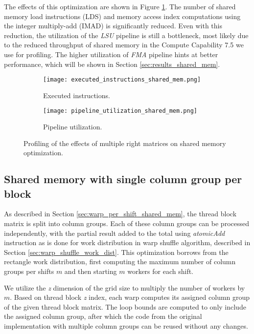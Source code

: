 
The effects of this optimization are shown in Figure \ref{fig:shared_memory_multimat_right_profiling}. The number of shared memory load instructions (LDS) and memory access index computations using the integer multiply-add (IMAD) is significantly reduced. Even with this reduction, the utilization of the \textit{LSU} pipeline is still a bottleneck, most likely due to the reduced throughput of shared memory in the Compute Capability 7.5 we use for profiling. The higher utilization of \textit{FMA} pipeline hints at better performance, which will be shown in Section \ref{sec:results_shared_mem}.


\begin{figure}[ht]
	\centering	
	\begin{subfigure}{0.8\textwidth}
		\centering
		\texttt{[image: executed\_instructions\_shared\_mem.png]}
		\caption{Executed instructions.}
	\end{subfigure}
	\hfill
	\begin{subfigure}{0.8\textwidth}
		\centering
		\texttt{[image: pipeline\_utilization\_shared\_mem.png]}
		\caption{Pipeline utilization.}
	\end{subfigure}
	
	\caption{Profiling of the effects of multiple right matrices on shared memory optimization.}
	\label{fig:shared_memory_multimat_right_profiling}
\end{figure}

\subsection{Shared memory with single column group per block}
\label{sec:column_group_per_worker}
As described in Section \ref{sec:warp_per_shift_shared_mem}, the thread block matrix is split into column groups. Each of these column groups can be processed independently, with the partial result added to the total using \textit{atomicAdd} instruction as is done for work distribution in warp shuffle algorithm, described in Section \ref{sec:warp_shuffle_work_dist}. This optimization borrows from the rectangle work distribution, first computing the maximum number of column groups per shifts $m$ and then starting $m$ workers for each shift.

We utilize the \textit{z} dimension of the grid size to multiply the number of workers by $m$. Based on thread block \textit{z} index, each warp computes its assigned column group of the given thread block matrix. The loop bounds are computed to only include the assigned column group, after which the code from the original implementation with multiple column groups can be reused without any changes.

